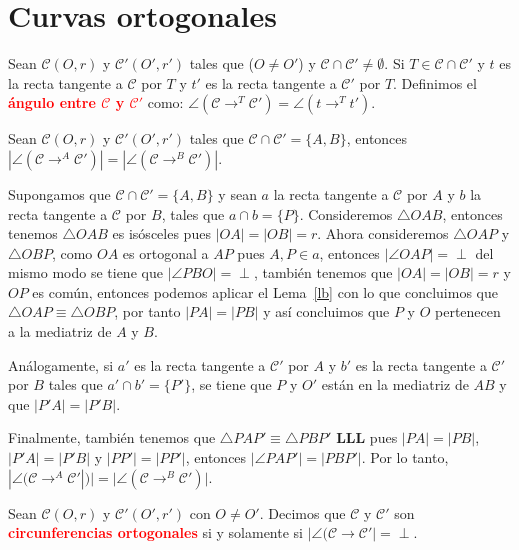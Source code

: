 \section{Curvas ortogonales}
\begin{df}
Sean $\mathcal{C}(O,r)$ y $\mathcal{C'}(O',r')$ tales que ($O\neq O'$) y $\mathcal{C}\cap\mathcal{C'}\neq\emptyset$. Si $T\in\mathcal{C}\cap\mathcal{C'}$ y $t$ es la recta tangente a $\mathcal{C}$ por $T$ y $t'$ es la recta tangente a $\mathcal{C'}$ por $T$. Definimos el \textcolor{red}{\bf ángulo entre $\mathcal{C}$ y $\mathcal{C'}$} como: $\angle(\mathcal{C}\longrightarrow^{T}\mathcal{C'})=\angle (t\longrightarrow^{T} t')$.
\end{df}
\begin{prop}
Sean $\mathcal{C}(O,r)$ y $\mathcal{C'}(O',r')$ tales que $\mathcal{C}\cap\mathcal{C'}=\{A,B\}$, entonces $|\angle(\mathcal{C}\longrightarrow^{A}\mathcal{C'})|=|\angle(\mathcal{C}\longrightarrow^{B}\mathcal{C'})|$.
\end{prop}
\begin{pba}
Supongamos que $\mathcal{C}\cap\mathcal{C'}=\{A,B\}$ y sean $a$ la recta tangente a $\mathcal{C}$ por $A$ y $b$ la recta tangente a $\mathcal{C}$ por $B$, tales que $a\cap b=\{P\}$. Consideremos $\triangle OAB$, entonces tenemos $\triangle OAB$ es isósceles pues $|OA|=|OB|=r$. Ahora consideremos $\triangle OAP$ y $\triangle OBP$, como $OA$ es ortogonal a $AP$ pues $A,P\in a$, entonces $|\angle OAP|=\perp$ del mismo modo se tiene que $|\angle PBO|=\perp$, también tenemos que $|OA|=|OB|=r$ y $OP$ es común, entonces podemos aplicar el Lema~\ref{lb} con lo que concluimos que $\triangle OAP\equiv\triangle OBP$, por tanto $|PA|=|PB|$ y así concluimos que $P$ y $O$ pertenecen a la mediatriz de $A$ y $B$.

Análogamente, si $a'$ es la recta tangente a $\mathcal{C'}$ por $A$ y $b'$ es la recta tangente a $\mathcal{C'}$ por $B$ tales que $a'\cap b'=\{P'\}$, se tiene que $P$ y $O'$ están en la mediatriz de $AB$ y que $|P'A|=|P'B|$.

Finalmente, también tenemos que $\triangle PAP'\equiv\triangle PBP'$ \textbf{LLL} pues $|PA|=|PB|$, $|P'A|=|P'B|$ y $|PP'|=|PP'|$, entonces $|\angle PAP'|=|PBP'|$. Por lo tanto, $| \angle(\mathcal{C}\longrightarrow^{A}\mathcal{C'}|
)|=|\angle(\mathcal{C}\longrightarrow^{B}\mathcal{C'})|$.
\end{pba}
\begin{df}
Sean $\mathcal{C}(O,r)$ y $\mathcal{C'}(O',r')$ con $O\neq O'$. Decimos que $\mathcal{C}$ y $\mathcal{C'}$ son \textcolor{red}{\bf circunferencias ortogonales} si y solamente si $|\angle(\mathcal{C}\longrightarrow\mathcal{C'}|=\perp$.
\end{df}

